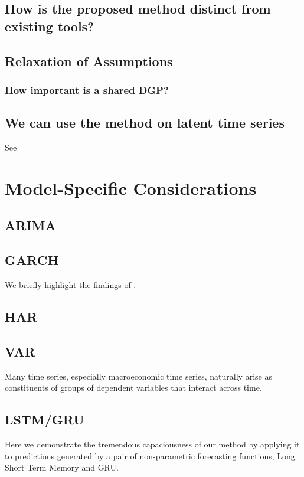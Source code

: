 \documentclass[11pt]{article}
\theoremstyle{definition}
\begin{document}
\subsection{How is the proposed method distinct from existing tools?}

\subsection{Relaxation of Assumptions}
\subsubsection{How important is a shared DGP?}

\subsection{We can use the method on latent time series}
See \cite{lundquist2024volatility}

\section{Model-Specific Considerations}\label{special_cases}

\subsection{ARIMA}
\cite{lin2021minimizing}
\subsection{GARCH}
We briefly highlight the findings of \citep{lundquist2024volatility}.
\subsection{HAR}
\subsection{VAR}
Many time series, especially macroeconomic time series, naturally arise as constituents of groups of dependent variables that interact across time.
\subsection{LSTM/GRU}

Here we demonstrate the tremendous capaciousness of our method by applying it to predictions generated by a pair of non-parametric forecasting functions, Long Short Term Memory and GRU.
\end{document}
